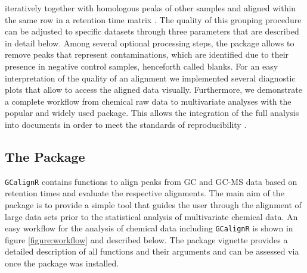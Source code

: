 iteratively together with homologous peaks of other samples and aligned
within the same row in a retention time matrix . The quality of this
grouping procedure can be adjusted to specific datasets through three
parameters that are described in detail below. Among several optional
processing steps, the package allows to remove peaks that represent
contaminations, which are identified due to their presence in negative
control samples, henceforth called blanks. For an easy interpretation of
the quality of an alignment we implemented several diagnostic plots that
allow to access the aligned data visually. Furthermore, we demonstrate a
complete workflow from chemical raw data to multivariate analyses with
the popular and widely used
\href{https://cran.r-project.org/web/packages/vegan/index.html}{}
\citep{Oksanen.2016} package. This allows the integration of the full
analysis into  documents \citep{Allaire.2016} in order
to meet the standards of reproducibility \citep{Peng.2011}.

\subsection{The Package}\label{the-package}

\texttt{GCalignR} contains functions to align peaks from GC and GC-MS
data based on retention times and evaluate the respective alignments.
The main aim of the package is to provide a simple tool that guides the
user through the alignment of large data sets prior to the statistical
analysis of multivariate chemical data. An easy workflow for the
analysis of chemical data including \texttt{GCalignR} is shown in figure
\ref{figure:workflow} and described below. The package vignette provides
a detailed description of all functions and their arguments and can be
assessed via  once the package was
installed.

